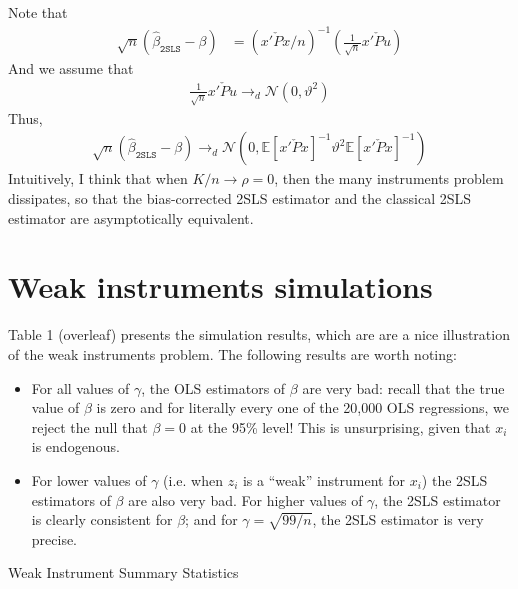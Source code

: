\documentclass[12pt]{article}
\newcommand{\E}{\mathbb{E}}
\newcommand{\mtx}[1]{\ensuremath{\bm{\mathit{#1}}}}
\newcommand{\N}{\mathcal{N}}
\begin{document}
\subsubsection{}
Note that
\begin{align*}
\sqrt{n}(\hat\beta_{\texttt{2SLS}} - \beta) &= (\mtx{x}'\check{\mtx{P}}\mtx{x}/n)^{-1}(\frac{1}{\sqrt{n}}\mtx{x}'\check{\mtx{P}}\mtx{u})
\end{align*}
And we assume that
\begin{align*}
\frac{1}{\sqrt{n}}\mtx{x}'\check{\mtx{P}}\mtx{u} \to_d \N(0, \vartheta^2)
\end{align*}
Thus,
\begin{align*}
\sqrt{n}(\hat\beta_{\texttt{2SLS}} - \beta) \to_d \N(0, \E[\mtx{x}'\check{\mtx{P}}\mtx{x}]^{-1}\vartheta^2\E[\mtx{x}'\check{\mtx{P}}\mtx{x}]^{-1})
\end{align*}
Intuitively, I think that when $K/n \to \rho = 0$, then the many instruments problem dissipates, so that the bias-corrected 2SLS estimator and the classical 2SLS estimator are asymptotically equivalent.

\newpage

\section{Weak instruments simulations}
Table 1 (overleaf) presents the simulation results, which are are a nice illustration of the weak instruments problem. The following results are worth noting:
\begin{itemize}
\item For all values of $\gamma$, the OLS estimators of $\beta$ are very bad: recall that the true value of $\beta$ is zero and for literally every one of the 20,000 OLS regressions, we reject the null that $\beta=0$ at the 95\% level! 
This is unsurprising, given that $x_i$ is endogenous.
\item For lower values of $\gamma$ (i.e. when $z_i$ is a ``weak'' instrument for $x_i$) the 2SLS estimators of $\beta$ are also very bad. For higher values of $\gamma$, the 2SLS estimator is clearly consistent for $\beta$; and for $\gamma = \sqrt{99/n}$, the 2SLS estimator is very precise.
\end{itemize}


\begin{landscape}
\begin{table}[!htp]
\centering
\renewcommand{\arraystretch}{1.5}  
\caption{Weak Instrument Summary Statistics}\label{tab:weak_IV_simulation}
\resizebox{0.45\paperwidth}{0.021\paperwidth}{\subfloat[][$\gamma^2=0/n$ ($F\approx1$)]{}}
\resizebox{0.45\paperwidth}{0.021\paperwidth}{\subfloat[][$\gamma^2=0.25/n$ ($F\approx1.25$)]{}}\\
\resizebox{0.45\paperwidth}{0.021\paperwidth}{\subfloat[][$\gamma^2=9/n$ ($F\approx10$)]{}}
\resizebox{0.45\paperwidth}{0.021\paperwidth}{\subfloat[][$\gamma^2=99/n$ ($F\approx100$)]{}}\\
\end{table}
\end{landscape}
\end{document}
